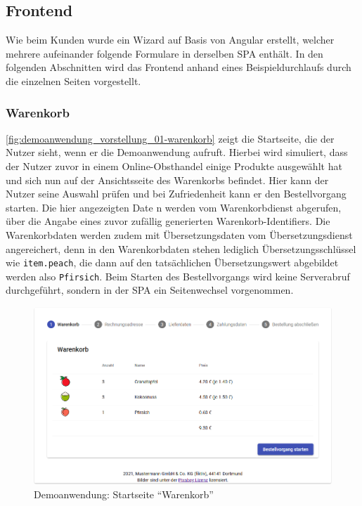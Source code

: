 \newpage

\subsection{Frontend}

Wie beim Kunden wurde ein Wizard auf Basis von Angular erstellt, welcher mehrere aufeinander folgende Formulare in derselben SPA enthält. In den folgenden Abschnitten wird das Frontend anhand eines Beispieldurchlaufs durch die einzelnen Seiten vorgestellt.

\subsubsection{Warenkorb}

\autoref{fig:demoanwendung_vorstellung_01-warenkorb} zeigt die Startseite, die der Nutzer sieht, wenn er die Demoanwendung aufruft. Hierbei wird simuliert, dass der Nutzer zuvor in einem Online-Obsthandel einige Produkte ausgewählt hat und sich nun auf der Ansichtsseite des Warenkorbs befindet. Hier kann der Nutzer seine Auswahl prüfen und bei Zufriedenheit kann er den Bestellvorgang starten. Die hier angezeigten Date
n werden vom Warenkorbdienst abgerufen, über die Angabe eines zuvor zufällig generierten Warenkorb-Identifiers. Die Warenkorbdaten werden zudem mit Übersetzungsdaten vom Übersetzungsdienst angereichert, denn in den Warenkorbdaten stehen lediglich Übersetzungsschlüssel wie \texttt{item.peach}, die dann auf den tatsächlichen Übersetzungswert abgebildet werden also \texttt{Pfirsich}. Beim Starten des Bestellvorgangs wird keine Serverabruf durchgeführt, sondern in der SPA ein Seitenwechsel vorgenommen.

\begin{figure}[H]
	\centering
	\includegraphics[width=1.00\linewidth]{img/04_erstellung-poc/demoanwendung_vorstellung_01-warenkorb.png}
	\caption{Demoanwendung: Startseite \enquote{Warenkorb}}
	\label{fig:demoanwendung_vorstellung_01-warenkorb}
\end{figure}

